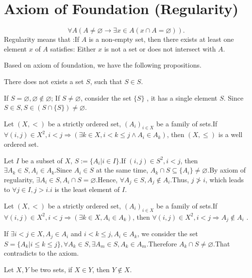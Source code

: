 \documentclass{book}
\numberwithin{equation}{section}
\begin{document}
\section{Axiom of Foundation (Regularity)}

\begin{axiomenv}
    $$\forall A(A\not=\varnothing\rightarrow\exists x\in A(x\cap A=\varnothing)).$$
    Regularity means that :If $A$ is a non-empty set, then there exists at least one element $x$ of $A$ satisfies: Either $x$ is not a set or does not intersect with $A$.
\end{axiomenv}
Based on axiom of foundation, we have the following propositions.
\begin{propositionenv}
    
    There does not exists a set $S$,  such that $S\in S$.
\end{propositionenv}
\begin{proofenv}
    If $S=\varnothing, \varnothing\notin\varnothing$; If $S\not=\varnothing$, consider the set $\{S\}$ , it has a single element $S$. Since $S\in S, S\in (S\cap\{S\})\not=\varnothing$.
\end{proofenv}
\begin{propositionenv}

    Let $(X, <)$ be a strictly ordered set,  $(A_i)_{i\in X}$ be a family of sets.If $\forall (i, j)\in X^2, i<j\Rightarrow(\exists k\in X, i<k\le j\wedge A_i\in A_k)$,  then $(X, \le)$ is a well ordered set.
\end{propositionenv}
\begin{proofenv}
    
    Let $I$ be a subset of $X$,  $S:=\{A_i|i\in I\}$.If $(i, j)\in S^2, i<j$,  then $\exists A_k\in S, A_i\in A_k$.Since $A_i\in S$ at the same time,  $A_k\cap S\subseteq\{A_i\}\not=\varnothing$.By axiom of regularity, $\exists A_i\in S, A_i\cap S=\varnothing$.Hence, $\forall A_j\in S, A_j\notin A_i$.Thus, $j\not>i$, which leads to $\forall j\in I,  j>i$.$i$ is the least element of $I$.
\end{proofenv}
\begin{propositionenv}
   Let $(X, <)$ be a strictly ordered set,  $(A_i)_{i\in X}$ be a family of sets.If $\forall (i, j)\in X^2, i<j\Rightarrow(\exists k\in X,  A_i\in A_k)$,  then $\forall (i, j)\in X^2, i<j\Rightarrow A_j\notin A_i$ .
\end{propositionenv}
\begin{proofenv}
    If $\exists i<j\in X, A_j\in A_i$ and $i<k\le j, A_i\in A_k$, we consider the set $S=\{A_k|i\le k\le j\}, \forall A_k\in S, \exists A_m\in S, A_k\in A_m$.Therefore $A_k\cap S\not=\varnothing$.That contradicts to the axiom.
\end{proofenv}
\begin{corollaryenv}
    Let $X, Y$ be two sets,  if $X\in Y$,  then $Y\notin X$.
\end{corollaryenv}
\end{document}
